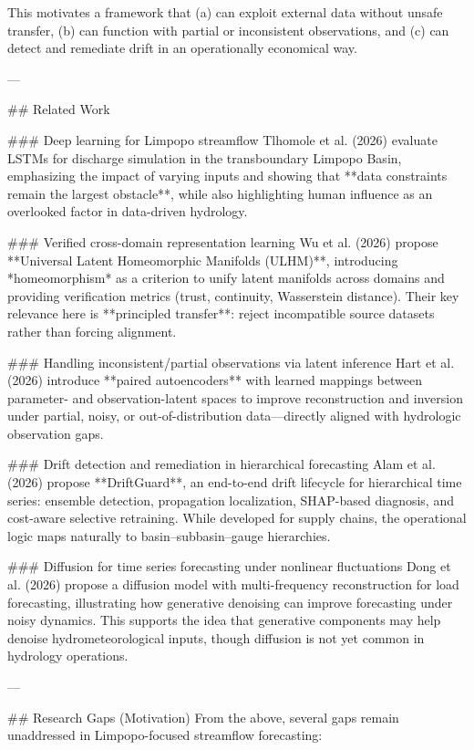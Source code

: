 This motivates a framework that (a) can exploit external data without unsafe transfer, (b) can function with partial or inconsistent observations, and (c) can detect and remediate drift in an operationally economical way.

---

## Related Work  

### Deep learning for Limpopo streamflow  
Tlhomole et al. (2026) evaluate LSTMs for discharge simulation in the transboundary Limpopo Basin, emphasizing the impact of varying inputs and showing that **data constraints remain the largest obstacle**, while also highlighting human influence as an overlooked factor in data-driven hydrology.

### Verified cross-domain representation learning  
Wu et al. (2026) propose **Universal Latent Homeomorphic Manifolds (ULHM)**, introducing *homeomorphism* as a criterion to unify latent manifolds across domains and providing verification metrics (trust, continuity, Wasserstein distance). Their key relevance here is **principled transfer**: reject incompatible source datasets rather than forcing alignment.

### Handling inconsistent/partial observations via latent inference  
Hart et al. (2026) introduce **paired autoencoders** with learned mappings between parameter- and observation-latent spaces to improve reconstruction and inversion under partial, noisy, or out-of-distribution data—directly aligned with hydrologic observation gaps.

### Drift detection and remediation in hierarchical forecasting  
Alam et al. (2026) propose **DriftGuard**, an end-to-end drift lifecycle for hierarchical time series: ensemble detection, propagation localization, SHAP-based diagnosis, and cost-aware selective retraining. While developed for supply chains, the operational logic maps naturally to basin–subbasin–gauge hierarchies.

### Diffusion for time series forecasting under nonlinear fluctuations  
Dong et al. (2026) propose a diffusion model with multi-frequency reconstruction for load forecasting, illustrating how generative denoising can improve forecasting under noisy dynamics. This supports the idea that generative components may help denoise hydrometeorological inputs, though diffusion is not yet common in hydrology operations.

---

## Research Gaps (Motivation)  
From the above, several gaps remain unaddressed in Limpopo-focused streamflow forecasting:

